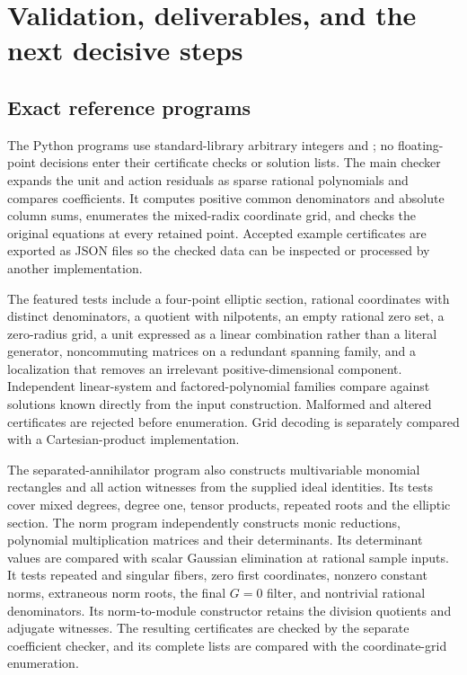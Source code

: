 \section{Validation, deliverables, and the next decisive steps}
\label{sec:validation}

\subsection{Exact reference programs}

The Python programs use standard-library arbitrary integers and
; no floating-point decisions enter their
certificate checks or solution lists. The main checker expands the
unit and action residuals as sparse rational polynomials and compares
coefficients. It computes positive common denominators and absolute
column sums, enumerates the mixed-radix coordinate grid, and checks the
original equations at every retained point. Accepted example certificates
are exported as JSON files so the checked data can be inspected or
processed by another implementation.

The featured tests include a four-point elliptic section, rational
coordinates with distinct denominators, a quotient with nilpotents,
an empty rational zero set, a zero-radius grid, a unit expressed as a
linear combination rather than a literal generator, noncommuting
matrices on a redundant spanning family, and a localization that removes
an irrelevant positive-dimensional component. Independent linear-system
and factored-polynomial families compare against solutions known directly
from the input construction. Malformed and altered certificates are
rejected before enumeration. Grid decoding is separately compared with
a Cartesian-product implementation.

The separated-annihilator program also constructs multivariable monomial
rectangles and all action witnesses from the supplied ideal identities.
Its tests cover mixed degrees, degree one, tensor products, repeated roots
and the elliptic section. The norm program independently constructs monic reductions, polynomial
multiplication matrices and their determinants. Its determinant values
are compared with scalar Gaussian elimination at rational sample inputs.
It tests repeated and singular fibers, zero first coordinates, nonzero
constant norms, extraneous norm roots, the final $G=0$ filter, and
nontrivial rational denominators. Its norm-to-module constructor retains
the division quotients and adjugate witnesses. The resulting certificates
are checked by the separate coefficient checker, and its complete lists
are compared with the coordinate-grid enumeration.

